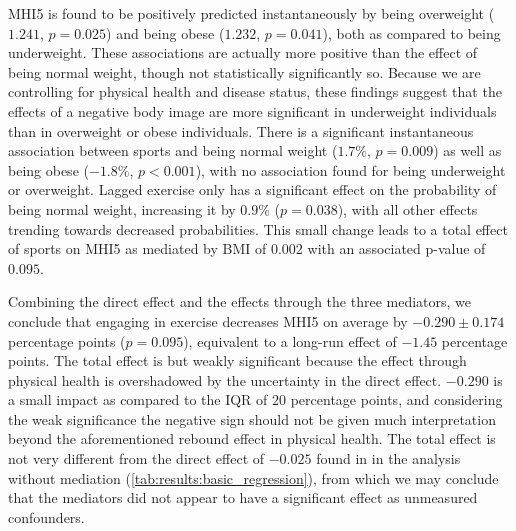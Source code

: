 MHI5 is found to be positively predicted instantaneously by being overweight ($1.241$, $p = 0.025$) and
being obese ($1.232$, $p = 0.041$), both as compared to being underweight. These associations are actually more positive
than the effect of being normal weight, though not statistically significantly so.
Because we are controlling for physical health and disease status, these findings suggest that the effects of a negative
body image are more significant in underweight individuals than in overweight or obese individuals.
There is a significant instantaneous association between sports and being normal weight ($1.7\%$, $p = 0.009$)
as well as being obese ($-1.8\%$, $p < 0.001$), with no association found for being underweight or overweight.
Lagged exercise only has a significant effect on the probability of being normal weight, increasing it by $0.9\%$ ($p = 0.038$),
with all other effects trending towards decreased probabilities.
This small change leads to a total effect of sports on MHI5 as mediated by BMI of $0.002$ with an associated p-value of $0.095$.

Combining the direct effect and the effects through the three mediators, we conclude that engaging in exercise decreases
MHI5 on average by $-0.290 \pm 0.174$ percentage points ($p = 0.095$), equivalent to a long-run effect of $-1.45$
percentage points.
The total effect is but weakly significant because the effect through physical health is overshadowed by the uncertainty
in the direct effect.
$-0.290$ is a small impact as compared to the IQR of $20$ percentage points, and considering the weak significance
the negative sign should not be given much interpretation beyond the aforementioned rebound effect in physical health.
The total effect is not very different from the direct effect of $-0.025$ found in in the analysis without mediation
(\cref{tab:results:basic_regression}), from which we may conclude that the mediators did not appear to have a significant
effect as unmeasured confounders.

